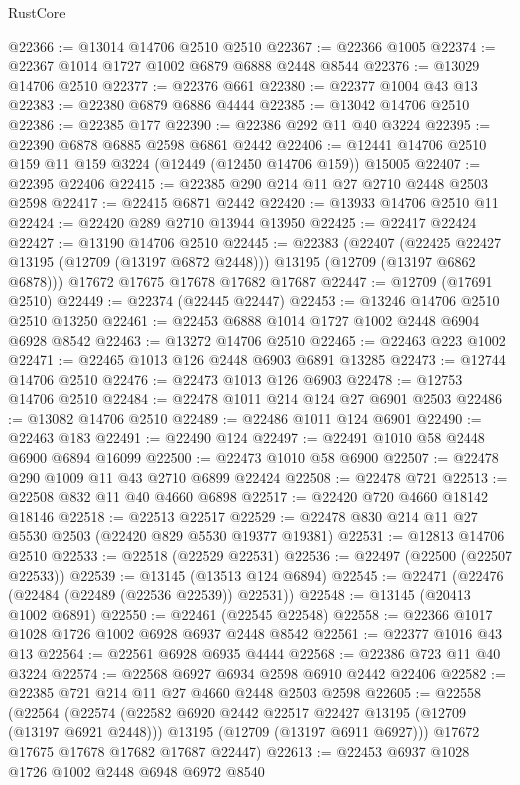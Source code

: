 \begin{lexlean}{RustCore}
\begin{coremodule}
@22366 := @13014 @14706 @2510 @2510
@22367 := @22366 @1005
@22374 := @22367 @1014 @1727 @1002 @6879 @6888 @2448 @8544
@22376 := @13029 @14706 @2510
@22377 := @22376 @661
@22380 := @22377 @1004 @43 @13
@22383 := @22380 @6879 @6886 @4444
@22385 := @13042 @14706 @2510
@22386 := @22385 @177
@22390 := @22386 @292 @11 @40 @3224
@22395 := @22390 @6878 @6885 @2598 @6861 @2442
@22406 := @12441 @14706 @2510 @159 @11 @159 @3224 (@12449 (@12450 @14706 @159)) @15005
@22407 := @22395 @22406
@22415 := @22385 @290 @214 @11 @27 @2710 @2448 @2503 @2598
@22417 := @22415 @6871 @2442
@22420 := @13933 @14706 @2510 @11
@22424 := @22420 @289 @2710 @13944 @13950
@22425 := @22417 @22424
@22427 := @13190 @14706 @2510
@22445 := @22383
    (@22407
      (@22425 @22427 @13195 (@12709 (@13197 @6872 @2448)))
      @13195
      (@12709 (@13197 @6862 @6878)))
    @17672
    @17675
    @17678
    @17682
    @17687
@22447 := @12709 (@17691 @2510)
@22449 := @22374 (@22445 @22447)
@22453 := @13246 @14706 @2510 @2510 @13250
@22461 := @22453 @6888 @1014 @1727 @1002 @2448 @6904 @6928 @8542
@22463 := @13272 @14706 @2510
@22465 := @22463 @223 @1002
@22471 := @22465 @1013 @126 @2448 @6903 @6891 @13285
@22473 := @12744 @14706 @2510
@22476 := @22473 @1013 @126 @6903
@22478 := @12753 @14706 @2510
@22484 := @22478 @1011 @214 @124 @27 @6901 @2503
@22486 := @13082 @14706 @2510
@22489 := @22486 @1011 @124 @6901
@22490 := @22463 @183
@22491 := @22490 @124
@22497 := @22491 @1010 @58 @2448 @6900 @6894 @16099
@22500 := @22473 @1010 @58 @6900
@22507 := @22478 @290 @1009 @11 @43 @2710 @6899 @22424
@22508 := @22478 @721
@22513 := @22508 @832 @11 @40 @4660 @6898
@22517 := @22420 @720 @4660 @18142 @18146
@22518 := @22513 @22517
@22529 := @22478 @830 @214 @11 @27 @5530 @2503 (@22420 @829 @5530 @19377 @19381)
@22531 := @12813 @14706 @2510
@22533 := @22518 (@22529 @22531)
@22536 := @22497 (@22500 (@22507 @22533))
@22539 := @13145 (@13513 @124 @6894)
@22545 := @22471 (@22476 (@22484 (@22489 (@22536 @22539)) @22531))
@22548 := @13145 (@20413 @1002 @6891)
@22550 := @22461 (@22545 @22548)
@22558 := @22366 @1017 @1028 @1726 @1002 @6928 @6937 @2448 @8542
@22561 := @22377 @1016 @43 @13
@22564 := @22561 @6928 @6935 @4444
@22568 := @22386 @723 @11 @40 @3224
@22574 := @22568 @6927 @6934 @2598 @6910 @2442 @22406
@22582 := @22385 @721 @214 @11 @27 @4660 @2448 @2503 @2598
@22605 := @22558
    (@22564
      (@22574
        (@22582 @6920 @2442 @22517 @22427 @13195 (@12709 (@13197 @6921 @2448)))
        @13195
        (@12709 (@13197 @6911 @6927)))
      @17672
      @17675
      @17678
      @17682
      @17687
      @22447)
@22613 := @22453 @6937 @1028 @1726 @1002 @2448 @6948 @6972 @8540

\end{coremodule}
\end{lexlean}
